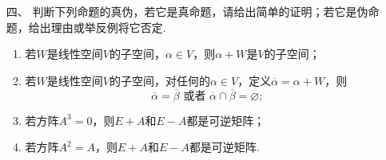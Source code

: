 \begin{enumerate}
	\item[四、]判断下列命题的真伪，若它是真命题，请给出简单的证明；若它是伪命题，给出理由或举反例将它否定.
	\begin{enumerate}[label=(\arabic*)]
        \item 若$W$是线性空间$V$的子空间，$\alpha\in V$，则$\alpha+W$是$V$的子空间；
        \item 若$W$是线性空间$V$的子空间，对任何的$\alpha\in V$，定义$\overline{\alpha}=\alpha+W$，则
        \[\overline{\alpha}=\overline{\beta}\text{ 或者 }\overline{\alpha}\cap\overline{\beta}=\varnothing;\]
        \item 若方阵$A^3=0$，则$E+A$和$E-A$都是可逆矩阵；
        \item 若方阵$A^2=A$，则$E+A$和$E-A$都是可逆矩阵.
    \end{enumerate}
\end{enumerate}
\newpage
